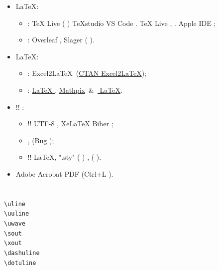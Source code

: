 \documentclass{article}
\begin{document}
\begin{frame}{ }
	\begin{itemize}
		\item<1-> \LaTeX  :
		\begin{itemize}
			\item<1->  : TeX Live ( \href{https://mirrors.tuna.tsinghua.edu.cn/CTAN/systems/texlive/Images/}{\color{BSblue} } ) TeXstudio VS Code . TeX Live ,  .  Apple IDE ;
			\item<1->  : Overleaf , Slager  ( ).
		\end{itemize}
		\item<2-> \LaTeX  :
		\begin{itemize}
			\item<2->  : Excel2\LaTeX~(\href{https://www.ctan.org/tex-archive/support/excel2latex/}{\color{BSblue}CTAN Excel2\LaTeX});
			\item<2->  : \href{https://www.latexlive.com/}{\color{BSblue}LaTeX }, \href{https://mathpix.com/}{\color{BSblue}
				Mathpix}~\&~\href{https://mathf.itewqq.cn/}{\color{BSblue} LaTeX}.
		\end{itemize}
		\item<3-> \color{JXred}!!  :
		\begin{itemize}
			\item<3-> \color{JXred}!!  UTF-8 ,  XeLaTeX Biber ;
			\item<3->  ,  (Bug );
			\item<3-> \color{JXred}!!  \LaTeX  ,  ".sty" ( ) ,  ( ).
		\end{itemize}
		\item<4-> \color{JXred}  Adobe Acrobat PDF (Ctrl+L ).
	\end{itemize}
\end{frame}

\section{ }
\subsection{ }
\begin{frame}[fragile]{ }
	\begin{multicols}{2}
		\verb|\uline|\hfill  \qquad\uline{ }\\
		\verb|\uuline|\hfill  \qquad\uuline{ }\\
		\verb|\uwave|\hfill  \qquad\uwave{ }\\
		\verb|\sout|\hfill  \qquad\sout{ }\\
		\verb|\xout|\hfill  \qquad\xout{ }\\
		\verb|\dashuline|\hfill  \qquad\dashuline{ }\\
		\verb|\dotuline|\hfill  \qquad\dotuline{ }
	\end{multicols}
\end{frame}
\end{document}
